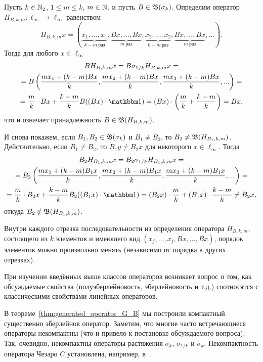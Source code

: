 \begin{example}
	Пусть $k\in \mathbb{N}_2$, $1 \leq m \leq k$, $m\in\mathbb{N}$, и пусть $B \in \mathfrak{B}(\sigma_k)$.
	Определим оператор $H_{B,k,m}:\ell_\infty \to \ell_\infty$ равенством
	\begin{equation}
		H_{B,k,m} x = (
			\underbrace{x_1, ..., x_1}_{k-m~\mbox{раз}}, \underbrace{Bx, ..., Bx}_{m~\mbox{раз}},
			\underbrace{x_2, ..., x_2}_{k-m~\mbox{раз}}, \underbrace{Bx, ..., Bx}_{m~\mbox{раз}},
			...)
		.
	\end{equation}
	Тогда для любого $x\in\ell_\infty$
	\begin{multline}
		B H_{B,k,m} x =
		B \sigma_{1/k} H_{B,k,m} x =
		\\=
		B\left(\dfrac{mx_1 + (k-m) Bx}{k}, \dfrac{mx_2 + (k-m) Bx}{k}, \dfrac{mx_3 + (k-m) Bx}{k}, ...\right)=
		\\=
		\dfrac{m}{k} \cdot Bx + \dfrac{k-m}{k} B ( (Bx)\cdot \one) =
		(Bx) \cdot \left(\dfrac m k + \dfrac{k-m}k \right) = Bx
		,
	\end{multline}
	что и означает принадлежность $B\in\mathfrak{B}(H_{B,k,m})$.

	И снова покажем, если $B_1, B_2 \in \mathfrak{B}(\sigma_k)$ и $B_1 \ne B_2$, то $B_2 \ne \mathfrak{B} (H_{B_1,k,m})$.
	Действительно, если $B_1 \ne B_2$, то $B_1y \ne B_2x$ для некоторого $x\in\ell_\infty$.
	Тогда
	\begin{multline}
		B_2 H_{B_1,k,m} x =
		B_2 \sigma_{1/k} H_{B_1,k,m} x =
		\\=
		B_2\left(\dfrac{mx_1 + (k-m) B_1x}{k}, \dfrac{mx_2 + (k-m) B_1x}{k}, \dfrac{mx_3 + (k-m) B_1x}{k}, ...\right)=
		\\=
		\dfrac{m}{k} \cdot B_2x + \dfrac{k-m}{k} B_2 ( (B_1x)\cdot \one) =
		(B_2x) \cdot \dfrac m k + (B_1x)\cdot \dfrac{k-m}k \ne B_2x
		,
	\end{multline}
	откуда $B_2\notin \mathfrak{B}(H_{B_1,k,m})$.
\end{example}

	Внутри каждого отрезка последовательности из определения оператора $H_{B,k,m}$,
	состоящего из $k$ элементов и имеющего вид $(x_j, ..., x_j, Bx, ..., Bx)$,
	порядок элементов можно произвольно менять (независимо от порядка в других отрезках).

При изучении введённых выше классов операторов возникает вопрос о том,
как обсуждаемые свойства (полуэберлейновость, эберлейновость и т.д.)
соотносятся с классическими свойствами линейных операторов.

В теореме~\ref{thm:generated_operator_G_B} мы построили компактный существенно эберлейнов оператор.
Заметим, что многие часто встречающиеся операторы некомпактны
(что и привело к постановке обсуждаемого вопроса).
Так, очевидно, некомпактны операторы растяжения $\sigma_k$, $\sigma_{1/k}$ и $\tilde\sigma_k$.
Некомпактность оператора Чезаро $C$ установлена, например, в~\cite[теорема 4.4]{ALALAM20181038}.
